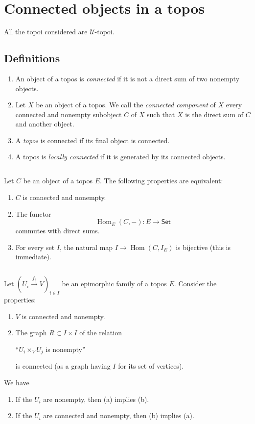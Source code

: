 \documentclass[10pt,oneside]{amsart}
\newcommand{\oldpage}[1]{\marginnote{\textbf{#1}}}
\newcommand{\cal}{\mathcal}
\newcommand{\cat}{\mathsf}
\DeclareMathOperator{\Hom}{Hom}
\begin{document}
\section{Connected objects in a topos}
\oldpage{1}
All the topoi considered are $\cal{U}$-topoi.

\subsection{Definitions}
\begin{enumerate}[label=(\alph*)]
  \item An object of a topos is \emph{connected} if it is not a direct sum of two nonempty objects.
  \item Let $X$ be an object of a topos.
    We call the \emph{connected component} of $X$ every connected and nonempty subobject $C$ of $X$ such that $X$ is the direct sum of $C$ and another object.
  \item A \emph{topos} is connected if its final object is connected.
  \item A topos is \emph{locally connected} if it is generated by its connected objects.
\end{enumerate}

\subsection{}
Let $C$ be an object of a topos $E$.
The following properties are equivalent:
\begin{enumerate}[label=(\alph*)]
  \item $C$ is connected and nonempty.
  \item The functor
    \[
      \Hom_E(C,-):E\longrightarrow\cat{Set}
    \]
    commutes with direct sums.
  \item For every set $I$, the natural map $I\to\Hom(C,I_E)$ is bijective (this is immediate).
\end{enumerate}

\subsection{}
\oldpage{2}
Let $(U_i\xrightarrow{f_i}V)_{i\in I}$ be an epimorphic family of a topos $E$.
Consider the properties:
\begin{enumerate}[label=(\alph*)]
  \item $V$ is connected and nonempty.
  \item The graph $R\subset I\times I$ of the relation
    \begin{center}
    ``$U_i\times_V U_j$ is nonempty''
    \end{center}
    is connected (as a graph having $I$ for its set of vertices).
\end{enumerate}
We have
\begin{enumerate}[label=(\roman*)]
  \item If the $U_i$ are nonempty, then (a) implies (b).
  \item If the $U_i$ are connected and nonempty, then (b) implies (a).
\end{enumerate}
\end{document}
